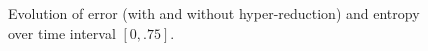 \documentclass[preprint,10pt]{elsarticle}
\theoremstyle{definition}
\theoremstyle{lemma}
\theoremstyle{theorem}
\theoremstyle{assumption}
\begin{document}
\begin{figure}[!h]
\centering
{}
\hspace{.5em}
\caption{Evolution of error (with and without hyper-reduction) and entropy over time interval $[0,.75]$.}
\label{fig:entropyevo}
\end{figure}
\end{document}
